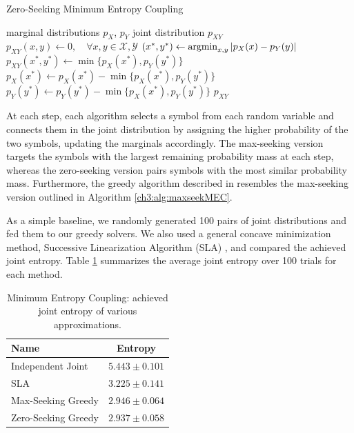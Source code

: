 \begin{algorithm}[H]
\caption{Zero-Seeking Minimum Entropy Coupling}\label{ch3:alg:zeroseeking}
\begin{algorithmic}[1]
    \Require marginal distributions $p_X$, $p_Y$
    \Ensure joint distribution $p_{XY}$
    \vspace{2pt}
    \State $p_{XY}(x, y) \gets 0, \quad \forall x, y \in \mathcal{X}, \mathcal{Y}$
        \State $(x^*, y^*) \gets \operatorname*{argmin}_{x, y}|p_X(x)-p_Y(y)|$
        \State $p_{XY}(x^*, y^*) \gets \min\{p_X(x^*), p_Y(y^*)\}$
        \State $p_X(x^*) \gets  p_X(x^*) - \min\{p_X(x^*), p_Y(y^*)\}$
        \State $p_Y(y^*) \gets  p_Y(y^*) - \min\{p_X(x^*), p_Y(y^*)\}$
    \EndWhile
    \State\Return $p_{XY}$
\end{algorithmic}
\end{algorithm}

At each step, each algorithm selects a symbol from each random variable and connects them in the joint distribution by assigning the higher probability of the two symbols, updating the marginals accordingly. The max-seeking version targets the symbols with the largest remaining probability mass at each step, whereas the zero-seeking version pairs symbols with the most similar probability mass. Furthermore, the greedy algorithm described in \cite{kocaoglu2017entropic} resembles the max-seeking version outlined in Algorithm \ref{ch3:alg:maxseekMEC}.

As a simple baseline, we randomly generated 100 pairs of joint distributions and fed them to our greedy solvers. We also used a general concave minimization method, Successive Linearization Algorithm (SLA) \cite{palacios1982nonlinear}, and compared the achieved joint entropy. Table \ref{ch3:table:maxIresult} summarizes the average joint entropy over 100 trials for each method.

\begin{table}[h]
\centering
\caption{Minimum Entropy Coupling: achieved joint entropy of various approximations.}
\label{ch3:table:maxIresult}
\begin{tabular}{lc}
    \toprule
    \textbf{Name}           & \textbf{Entropy} \\ 
    \midrule
    Independent Joint \hspace{4em}       & $5.443 \pm 0.101$  \\ 
    SLA                     & $3.225 \pm 0.141$  \\ 
    Max-Seeking Greedy      & $2.946 \pm 0.064$  \\
    Zero-Seeking Greedy     & $2.937 \pm 0.058$  \\
    \bottomrule
\end{tabular}
\end{table}
\FloatBarrier


